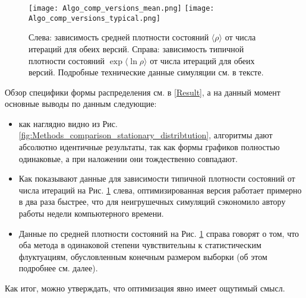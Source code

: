\begin{figure}[h!]
	\label{fig:Methods_comparison_moments_convergence}
	\centering
	\texttt{[image: Algo\_comp\_versions\_mean.png]}
	\texttt{[image: Algo\_comp\_versions\_typical.png]}
	\caption{Слева: зависимость средней плотности состояний $\langle \rho \rangle$ от числа итераций для обеих версий. Справа: зависимость типичной плотности состояний $\exp{\langle \ln \rho \rangle}$ от числа итераций для обеих версий. Подробные технические данные симуляции см. в тексте.}
\end{figure}

Обзор специфики формы распределения см. в \autoref{Result}, а на данный момент основные выводы по данным следующие:
\begin{itemize}
	\item как наглядно видно из Рис. \ref{fig:Methods_comparison_stationary_distribtution}, алгоритмы дают абсолютно идентичные результаты, так как формы графиков полностью одинаковые, а при наложении они тождественно совпадают.
	\item Как показывают данные для зависимости типичной плотности состояний от числа итераций на Рис. \ref{fig:Methods_comparison_moments_convergence} слева, оптимизированная версия работает примерно в два раза быстрее, что для неигрушечных симуляций сэкономило автору работы недели компьютерного времени.
	\item Данные по средней плотности состояний на Рис. \ref{fig:Methods_comparison_moments_convergence} справа говорят о том, что оба метода в одинаковой степени чувствительны к статистическим флуктуациям, обусловленным конечным размером выборки (об этом подробнее см. далее).
\end{itemize}
Как итог, можно утверждать, что оптимизация явно имеет ощутимый смысл.


